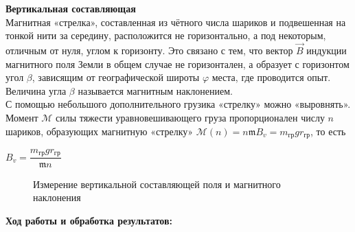 \documentclass[a4paper, 12pt]{article}%
\begin{document}
	\textbf{Вертикальная составляющая} \\
	
	Магнитная «стрелка», составленная из чётного числа
	шариков и подвешенная на тонкой нити за середину, расположится не горизонтально, а под некоторым, отличным от нуля, углом к горизонту. Это связано с тем, что вектор $\vec{B}$ индукции магнитного поля Земли в общем случае не горизонтален, а образует с горизонтом
	угол $\beta$, зависящим от географической широты $\varphi$
	места, где проводится опыт. Величина угла $\beta$
	называется магнитным наклонением.\\
	С помощью небольшого дополнительного грузика «стрелку» можно «выровнять». Момент $\mathcal M$ силы тяжести уравновешивающего груза пропорционален числу $n$ шариков, образующих магнитную «стрелку» $\mathcal M(n) = n\mathfrak m B_v = m_{\text{гр}}g r_{\text{гр}}$, то есть
	\begin{center}
		{$B_v = \dfrac{ m_{\text{гр}}g r_{\text{гр}}}{\mathfrak m n}$}
	\end{center}
\begin{figure}[H]
	\caption{Измерение вертикальной составляющей поля и магнитного наклонения}
\end{figure}


	\newpage
	
	\textbf{Ход работы и обработка результатов: }
	
\end{document}
